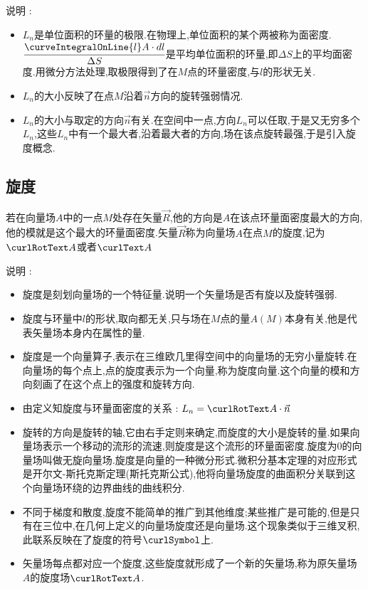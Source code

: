 {{{{      说明 :
      \begin{itemize}
        \item $L_n$是单位面积的环量的极限.在物理上,单位面积的某个两被称为面密度.$\cfrac{\curveIntegralOnLine{l}A \cdot dl}{\Delta S}$是平均单位面积的环量,即$\Delta S$上的平均面密度.用微分方法处理,取极限得到了在$M$点的环量密度,与$l$的形状无关.
        \item $L_n$的大小反映了在点$M$沿着$\vec{n}$方向的旋转强弱情况.
        \item $L_n$的大小与取定的方向$\vec{n}$有关.在空间中一点,方向$L_n$可以任取,于是又无穷多个$L_n$,这些$L_n$中有一个最大者,沿着最大者的方向,场在该点旋转最强,于是引入旋度概念.
      \end{itemize}
    }%

    \subsection{旋度}{
      若在向量场$A$中的一点$M$处存在矢量$\vec{R}$,他的方向是$A$在该点环量面密度最大的方向,他的模就是这个最大的环量面密度.矢量$\vec{R}$称为向量场$A$在点$M$的旋度,记为$\curlRotText A$或者$\curlText A$

      说明 :
      \begin{itemize}
        \item 旋度是刻划向量场的一个特征量.说明一个矢量场是否有旋以及旋转强弱.
        \item 旋度与环量中$l$的形状,取向都无关,只与场在$M$点的量$A(M)$本身有关,他是代表矢量场本身内在属性的量.
        \item 旋度是一个向量算子,表示在三维欧几里得空间中的向量场的无穷小量旋转.在向量场的每个点上,点的旋度表示为一个向量,称为旋度向量.这个向量的模和方向刻画了在这个点上的强度和旋转方向.
        \item 由定义知旋度与环量面密度的关系 : $L_n = \curlRotText A \cdot \vec{n}$
        \item 旋转的方向是旋转的轴,它由右手定则来确定,而旋度的大小是旋转的量.如果向量场表示一个移动的流形的流速,则旋度是这个流形的环量面密度.旋度为0的向量场叫做无旋向量场.旋度是向量的一种微分形式.微积分基本定理的对应形式是开尔文-斯托克斯定理(斯托克斯公式),他将向量场旋度的曲面积分关联到这个向量场环绕的边界曲线的曲线积分.
        \item 不同于梯度和散度,旋度不能简单的推广到其他维度;某些推广是可能的,但是只有在三位中,在几何上定义的向量场旋度还是向量场.这个现象类似于三维叉积,此联系反映在了旋度的符号$\curlSymbol$上.
        \item 矢量场每点都对应一个旋度,这些旋度就形成了一个新的矢量场,称为原矢量场$A$的旋度场$\curlRotText A$.
      \end{itemize}
    }%

}}}

